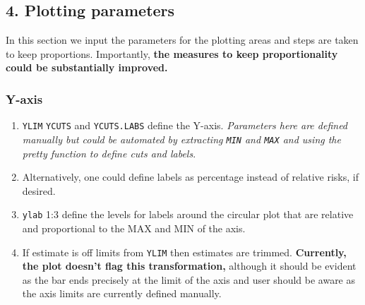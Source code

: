\documentclass[
]{article}
\providecommand{\tightlist}{%
  \setlength{\itemsep}{0pt}\setlength{\parskip}{0pt}}
\begin{document}
\hypertarget{plotting-parameters}{%
\subsection{4. Plotting parameters}\label{plotting-parameters}}

In this section we input the parameters for the plotting areas and steps
are taken to keep proportions. Importantly, \textbf{the measures to keep
proportionality could be substantially improved.}

\hypertarget{y-axis}{%
\subsubsection{Y-axis}\label{y-axis}}

\begin{enumerate}
\def\labelenumi{\arabic{enumi}.}
\tightlist
\item
  \texttt{YLIM} \texttt{YCUTS} and \texttt{YCUTS.LABS} define the
  Y-axis. \emph{Parameters here are defined manually but could be
  automated by extracting \texttt{MIN} and \texttt{MAX} and using the
  pretty function to define cuts and labels}.
\item
  Alternatively, one could define labels as percentage instead of
  relative risks, if desired.
\item
  \texttt{ylab} 1:3 define the levels for labels around the circular
  plot that are relative and proportional to the MAX and MIN of the
  axis.
\item
  If estimate is off limits from \texttt{YLIM} then estimates are
  trimmed. \textbf{Currently, the plot doesn't flag this
  transformation,} although it should be evident as the bar ends
  precisely at the limit of the axis and user should be aware as the
  axis limits are currently defined manually.
\end{enumerate}
\end{document}
